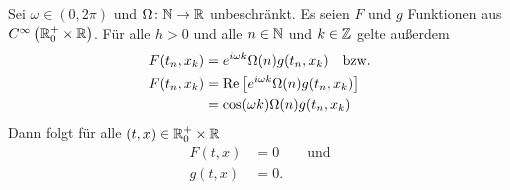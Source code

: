 \begin{satz}\label{satz:alt:beidenull}
Sei $\omega \in (0, 2 \pi)$ und $\Omega\colon \mathbb N \to \mathbb R$ unbeschränkt. 
Es seien $F$ und $g$ Funktionen aus $C^{\infty}\left( \mathbb R^+_0 \times \mathbb R \right)$. Für alle $h > 0$ und alle $n \in \mathbb N$ und $k \in \mathbb Z$ gelte außerdem
\begin{align}\label{eq:apx:beidenull}
\begin{split}
F(t_n,x_k) &= e^{i \omega k} \Omega(n) g(t_n,x_k) \quad \text{bzw.}\\
F(t_n,x_k) &= \operatorname{Re} \left[ e^{i \omega k} \Omega(n) g(t_n,x_k) \right]\\
           &= \cos(\omega k) \Omega(n) g(t_n, x_k)
\end{split}
\end{align}
Dann folgt für alle $(t,x) \in \mathbb R^+_0 \times \mathbb R$
\begin{align*}
F(t,x) &= 0 \qquad \text{und}\\ 
g(t,x) &= 0. 
\end{align*} 
\end{satz}
